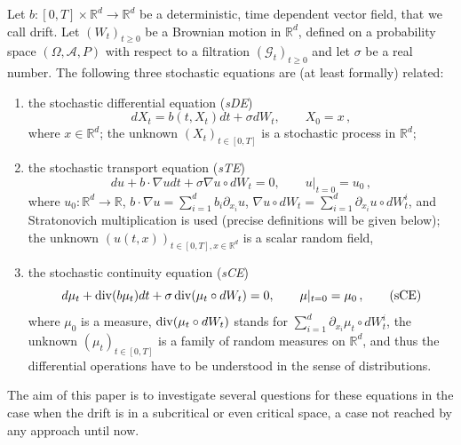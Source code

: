 \documentclass[a4paper,10pt]{article}
\def\func#1{\mathop{\rm #1}}
\begin{document}
Let $b \colon [ 0,T] \times\mathbb{R}^{d}\rightarrow\mathbb{R}^{d}$ be a
deterministic, time dependent vector field, that we call drift. Let $(
W_{t}) _{t\geq0}$ be a Brownian motion in $\mathbb{R}^{d}$, defined on
a probability space $(\Omega,\mathcal{A},P)$ with respect to a
filtration $(\mathcal{G}_{t}) _{t\geq0}$ and let $\sigma$ be a
real number. The following three stochastic equations are (at least
formally) related:

\begin{enumerate}
  \item the stochastic differential equation (\textit{sDE}) 
  \begin{equation}
  dX_{t}=b(t,X_{t}) dt+\sigma dW_{t},\qquad X_{0}=x \,, \tag{sDE}
  \label{SDE}
  \end{equation}
  where $x\in\mathbb{R}^{d}$; the unknown $(X_{t}) _{t\in [0,T]}$ is a stochastic process in $\mathbb{R}^{d}$;
  \item the stochastic transport equation (\textit{sTE})
  \begin{equation}
  du+b\cdot\nabla udt+\sigma\nabla u\circ dW_{t}=0,\qquad u|_{t=0}=u_{0} \,, 
  \tag{sTE}  \label{stoch transport}
  \end{equation}
  where $u_{0} \colon \mathbb{R}^{d}\rightarrow\mathbb{R}$, 
  $b\cdot\nabla u=\sum_{i=1}^{d}b_{i}\partial_{x_{i}}u$, $\nabla u\circ dW_{t}=\sum_{i=1}^{d}\partial_{x_{i}}u\circ dW_{t}^{i}$, and Stratonovich
  multiplication is used (precise definitions will be given below); the
  unknown $(u(t,x))_{t\in [ 0,T] ,x\in \mathbb{R}^{d}}$ is a scalar random field,
  \item the stochastic continuity equation (\textit{sCE}) 
  \begin{equation}
  d\mu_{t}+\func{div}(b\mu_{t}) dt+\sigma \func{div} 
  (\mu_{t}\circ dW_{t}) =0,\qquad\mu|_{t=0}=\mu_{0} \,, \tag{sCE}
  \label{stoch cont}
  \end{equation}
  where $\mu_{0}$ is a measure, $\func{div}(\mu_{t}\circ dW_{t})$
  stands for $\sum_{i=1}^{d}\partial_{x_{i}}\mu_{t}\circ dW_{t}^{i}$, the
  unknown $(\mu_{t}) _{t\in [ 0,T] }$ is a family of
  random measures on $\mathbb{R}^{d}$, and thus the differential operations
  have to be understood in the sense of distributions.
\end{enumerate}

The aim of this paper is to investigate several questions for these
equations in the case when the drift is in a subcritical or even critical
space, a case not reached by any approach until now.
\end{document}
